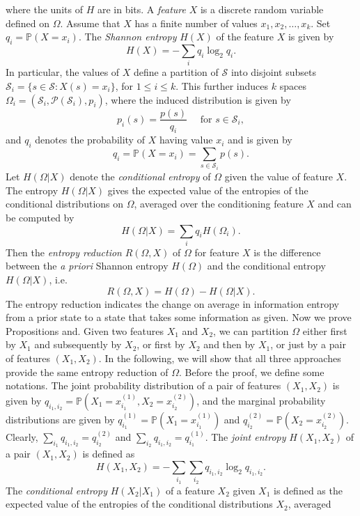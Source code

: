 \documentclass[preprint,authoryear]{elsarticle}
\begin{document}
where the units of $H$ are
in bits.
A \emph{feature} $X$ is a discrete random variable defined on $\Omega$. 
Assume that $X$ has a finite number of values $x_1,x_2,\ldots,x_k$. Set $q_i=\mathbb{P}(X=x_i)$. 
The \emph{Shannon entropy} $H(X)$  of the feature $X$ is given by
\begin{equation*}
H(X) = -\sum_{i} q_i \log_2 q_i.
\end{equation*}
In particular, the values of $X$ define a partition of  $ \mathcal{S}$ %
into disjoint subsets $ \mathcal{S}_i=\{s\in  \mathcal{S}:X(s)=x_i\}$, for $1\leq i \leq k$.
This further induces $k$ spaces $\Omega_i=(\mathcal{S}_i,\mathcal{P}(\mathcal{S}_i),p_i)$,
where the induced distribution is given by
\[
p_i(s)=\frac{p(s)}{q_i} \quad \text{ for } s\in  \mathcal{S}_i,
\]
and $q_i$ denotes the probability of $X$ having value $x_i$ and is given by
\begin{equation*}
q_i =\mathbb{P}(X=x_i)= \sum_{s\in  \mathcal{S}_i} p(s).
\end{equation*}
Let $H(\Omega|X) $ denote the \emph{conditional entropy} of $\Omega$ given the value of feature $X$. 
The entropy $H(\Omega|X) $ gives the expected value of the entropies of the conditional distributions on $\Omega$, 
averaged over the conditioning feature $X$ and  can be computed by 
\begin{equation*}
H(\Omega|X)= \sum_i q_i H(\Omega_i).
\end{equation*}
Then the \emph{entropy reduction} %
$R(\Omega,X)$ of $\Omega$ for feature $X$ 
is the difference between the \textit{a priori} Shannon entropy $H(\Omega)$ and the conditional entropy $H(\Omega|X) $, i.e. 
\begin{equation*}
R(\Omega,X)= H(\Omega)-H(\Omega|X). 
\end{equation*}
The entropy reduction indicates the change on average in information entropy from a prior state to a state that takes some information as given.
Now we prove Propositions and. %
Given two features $X_1$ and $X_2$, we can  partition $\Omega$ either   first by $X_1$ and  subsequently  by  $X_2$,
or  first by $X_2$ and then  by  $X_1$, or just by  a pair of features $(X_1,X_2)$.  
In the following, we will show that all three approaches provide the same entropy reduction of $\Omega$.
Before the proof, we define some notations. 
The joint probability distribution of  a pair of features $(X_1,X_2)$ is given by 
$q_{i_1,i_2}= \mathbb{P}(X_1=x^{(1)}_{i_1},X_2=x^{(2)}_{i_2})$, 
and the marginal probability distributions are given by
$q^{(1)}_{i_1}=\mathbb{P}(X_1=x^{(1)}_{i_1})$ and $q^{(2)}_{i_2}=\mathbb{P}(X_2=x^{(2)}_{i_2})$.
Clearly, $\sum_{i_1}q_{i_1,i_2}=q^{(2)}_{i_2} $ and $\sum_{i_2}q_{i_1,i_2}=q^{(1)}_{i_1} $.
The \emph{joint entropy} $H (X_1,X_2) $ of a pair  $(X_1,X_2)$ is defined as
\begin{equation*}
H (X_1,X_2)= -\sum_{i_1} \sum_{i_2}  q_{i_1,i_2}  \log_2 q_{i_1,i_2}.
\end{equation*}
The \emph{conditional entropy} $H(X_2|X_1)$ of a feature $X_2$ given $X_1$ is 
defined as the expected value of  the entropies of  the conditional distributions $X_2$, 
averaged
\end{document}

